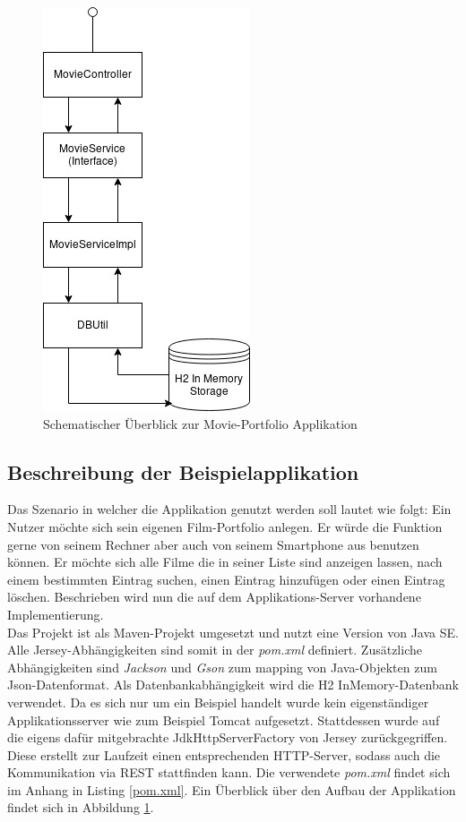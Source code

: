 \documentclass[fleqn,10.5pt,ngerman]{SelfArx}
\begin{document}
\begin{figure}[ht]\centering
	\includegraphics[width=6 cm]{Abbildungen/overview.jpg}
	\caption{Schematischer Überblick zur Movie-Portfolio Applikation}
	\label{fig:overview}
\end{figure}
\subsection{Beschreibung der Beispielapplikation}
Das Szenario in welcher die Applikation genutzt werden soll lautet wie folgt: Ein Nutzer möchte sich sein eigenen Film-Portfolio anlegen. Er würde die Funktion gerne von seinem Rechner aber auch von seinem Smartphone aus benutzen können. Er möchte sich alle Filme die in seiner Liste sind anzeigen lassen, nach einem bestimmten Eintrag suchen, einen Eintrag hinzufügen oder einen Eintrag löschen. Beschrieben wird nun die auf dem Applikations-Server vorhandene Implementierung. \\ Das Projekt ist als Maven-Projekt umgesetzt und nutzt eine Version von Java SE. Alle Jersey-Abhängigkeiten sind somit in der \textit{pom.xml} definiert. Zusätzliche Abhängigkeiten sind \textit{Jackson} und \textit{Gson} zum mapping von Java-Objekten zum Json-Datenformat. Als Datenbankabhängigkeit wird die H2 InMemory-Datenbank verwendet. Da es sich nur um ein Beispiel handelt wurde kein eigenständiger Applikationsserver wie zum Beispiel Tomcat aufgesetzt. Stattdessen wurde auf die eigens dafür mitgebrachte JdkHttpServerFactory von Jersey zurückgegriffen. Diese erstellt zur Laufzeit einen entsprechenden HTTP-Server, sodass auch die Kommunikation via REST stattfinden kann. Die verwendete \textit{pom.xml} findet sich im Anhang in Listing \ref{pom.xml}.
Ein Überblick über den Aufbau der Applikation findet sich in Abbildung \ref{fig:overview}.
\end{document}
